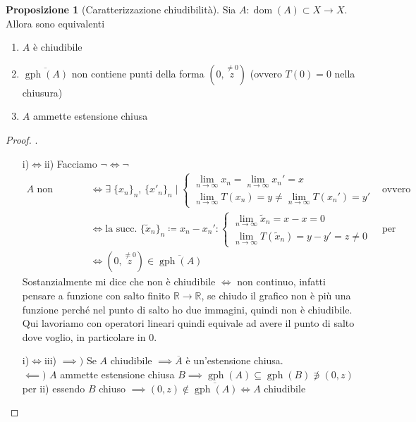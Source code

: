 \documentclass[a4paper,10pt]{article}
\theoremstyle{definition}
\DeclareMathOperator*{\dom}{dom} %
\DeclareMathOperator*{\gr}{gph} %
\newcommand{\re}{\mathbb{R}} %
\theoremstyle{indentdefinition}
\theoremstyle{indenttheorem}
\newtheorem{prop}{Proposizione}
\theoremstyle{myremark}
\theoremstyle{indentgeneral}
\newenvironment{myboxed} 
{\noindent\begin{lrbox}{\mybox}\begin{minipage}{\textwidth}}
{\end{minipage}\end{lrbox}\fbox{\usebox{\mybox}}}
\begin{document}
\begin{myboxed}
    \begin{prop}[Caratterizzazione chiudibilità]
        Sia $A:\dom(A)\subset X\to X$. Allora sono equivalenti
        \begin{enumerate}
            \item $A$ è chiudibile
            \item $\overline{\gr(A)}$ non contiene punti della forma $(0,\overset{\ne0}{z})$ (ovvero $T(0)=0$ nella chiusura)
            \item $A$ ammette estensione chiusa
        \end{enumerate}
    \end{prop}
\end{myboxed}

\begin{proof}
    .
    \begin{itemize}
        \item[i)$\iff$ii)] Facciamo $\neg\iff\neg$
        \begin{align*}
        A \text{ non chiudibile }&\iff \exists\;\{x_n\}_n,\,\{x'_n\}_n\mid \begin{cases}
            \lim_{n\to\infty}x_n=\lim_{n\to\infty}x_n'=x\\
            \lim_{n\to\infty}T(x_n)=y\ne\lim_{n\to\infty}T(x_n')=y'
        \end{cases} & \text{ovvero non è continuo}\\
        &\iff \text{la succ. }\{\widetilde{x}_n\}_n\coloneqq x_n-x_n':\begin{cases}
            \lim_{n\to\infty}\widetilde{x}_n=x-x=0\\
            \lim_{n\to\infty}T(\widetilde{x}_n)=y-y'=z\ne 0
        \end{cases} & \text{per linearità traslo in 0}\\
        &\iff (0,\overset{\ne0}{z})\in\overline{\gr(A)}
        \end{align*}
        Sostanzialmente mi dice che non è chiudibile $\iff$ non continuo, infatti pensare a funzione con salto finito $\re\to\re$, se chiudo il grafico non è più una funzione perché nel punto di salto ho due immagini, quindi non è chiudibile. Qui lavoriamo con operatori lineari quindi equivale ad avere il punto di salto dove voglio, in particolare in 0.
        \item[i)$\iff$iii)] $\implies)$ Se $A$ chiudibile $\implies \overline{A}$ è un'estensione chiusa.
        \\$\impliedby)$ $A$ ammette estensione chiusa $B\implies \gr(A)\subseteq \gr(B)\not\ni (0,z)$ per ii) essendo $B$ chiuso $\implies (0,z)\notin\overline{\gr(A)}\iff A$ chiudibile
    \end{itemize}
\end{proof}
\end{document}
